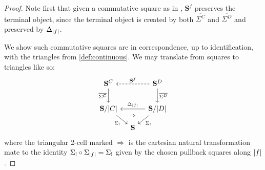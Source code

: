 \documentclass[11pt, oneside, article]{memoir}
\theoremstyle{plain}
\theoremstyle{definition}
\theoremstyle{remark}
\DeclarePairedDelimiter{\abs}{\lvert}{\rvert}
\newcommand{\bang}{\mathrm{!}}
\newcommand{\cat}[1]{\mathbf{#1}}
\newcommand{\CoalgOn}[2]{{#2}^{#1}}
\newcommand{\CoalgS}[1]{\CoalgOn{#1}{\bS}}
\newcommand{\pts}[1]{{\abs{#1}}}
\newcommand{\one}[1]{\pts{#1}}
\newcommand{\ptlift}[1]{\overline{#1}}
\newcommand{\carr}{\Sigma}
\newcommand{\leindex}[1]{\Sigma_{#1}}
\newcommand{\reindex}[1]{\Delta_{#1}}
\newcommand{\slicel}{\Sigma_\bang}
\newcommand{\car}[1]{\carr^{#1}}
\newcommand{\carC}{\car{\cC}}
\newcommand{\carD}{\car{\cD}}
\newcommand{\con}[2]{{#1}^{#2}}
\newcommand{\cmnd}[1]{{#1}}
\newcommand{\cC}{\cmnd{C}}
\newcommand{\cD}{\cmnd{D}}
\newcommand{\bS}{\cat{S}}
\newcommand{\CS}{\CoalgS{\cC}}
\newcommand{\DS}{\CoalgS{\cD}}
\newcommand{\SC}{\bS/\pts{\cC}}
\newcommand{\SD}{\bS/\pts{\cD}}
\begin{document}
\begin{proof}
  Note first that given a commutative square as in
  , $\con{\bS}{f}$ preserves the terminal
  object, since the terminal object is created by both
  $\ptlift{\carC}$ and $\ptlift{\carD}$ and preserved by
  $\reindex{\one{f}}$.
  
  We show such commutative squares are in correspondence, up to
  identification, with the triangles from \cref{def:continuous}.
  We may translate from squares to triangles like so:
  \[\begin{tikzcd}[column sep=10pt, row sep=10pt]
      \CS && \DS \\
      \\
      \SC && \SD \\
      & \bS
      \arrow["{\ptlift{\carC}}"', from=1-1, to=3-1]
      \arrow["{\con{\bS}{f}}"', dashed, from=1-3, to=1-1]
      \arrow["{\ptlift{\carD}}", from=1-3, to=3-3]
      \arrow["\slicel"', from=3-1, to=4-2]
      \arrow[""{name=0, anchor=center, inner sep=0}, "{\reindex{\one{f}}}"', from=3-3, to=3-1]
      \arrow["\slicel", from=3-3, to=4-2]
      \arrow["\Rightarrow"{description}, draw=none, from=0, to=4-2]
    \end{tikzcd}
  \]
  where the triangular 2-cell marked $\Rightarrow$ is the cartesian
  natural transformation mate to the identity
  $\slicel \circ \leindex{\one{f}} = \slicel$ given by the chosen
  pullback squares along $\one{f}$.


\end{proof}
\end{document}
